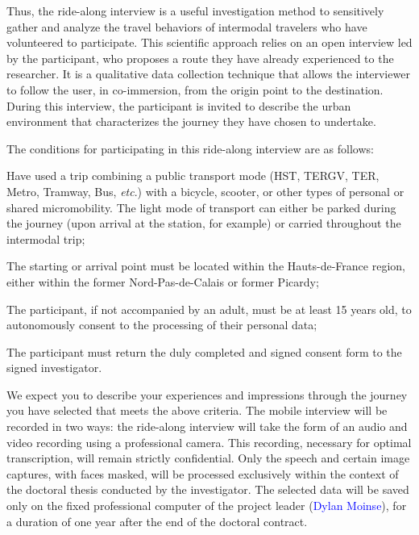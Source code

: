 Thus, the ride-along interview is a useful investigation method to sensitively gather and analyze the travel behaviors of intermodal travelers who have volunteered to participate. This scientific approach relies on an open interview led by the participant, who proposes a route they have already experienced to the researcher. It is a qualitative data collection technique that allows the interviewer to follow the user, in co-immersion, from the origin point to the destination. During this interview, the participant is invited to describe the urban environment that characterizes the journey they have chosen to undertake.%

The conditions for participating in this ride-along interview are as follows:
\begin{customitemize}
    \item Have used a trip combining a public transport mode (\acrshort{HST}, \acrshort{TERGV}, \acrshort{TER}, Metro, Tramway, Bus, \textsl{etc}.) with a bicycle, scooter, or other types of personal or shared micromobility. The light mode of transport can either be parked during the journey (upon arrival at the station, for example) or carried throughout the intermodal trip;
    \item The starting or arrival point must be located within the Hauts-de-France region, either within the former Nord-Pas-de-Calais or former Picardy;
    \item The participant, if not accompanied by an adult, must be at least 15 years old, to autonomously consent to the processing of their personal data;
    \item The participant must return the duly completed and signed consent form to the signed investigator.
\end{customitemize}%

We expect you to describe your experiences and impressions through the journey you have selected that meets the above criteria. The mobile interview will be recorded in two ways: the ride-along interview will take the form of an audio and video recording using a professional  camera. This recording, necessary for optimal transcription, will remain strictly confidential. Only the speech and certain image captures, with faces masked, will be processed exclusively within the context of the doctoral thesis conducted by the investigator. The selected data will be saved only on the fixed professional computer of the project leader (\textcolor{blue}{Dylan Moinse}), for a duration of one year after the end of the doctoral contract.%

